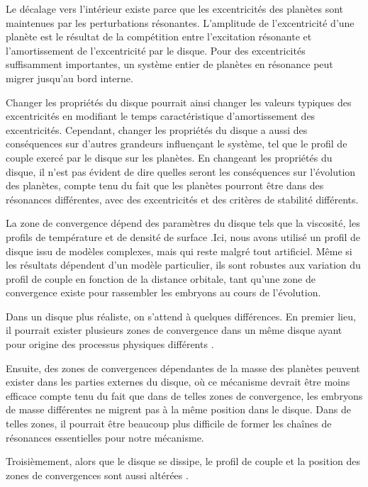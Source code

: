 \bigskip

Le décalage vers l'intérieur existe parce que les excentricités des planètes sont maintenues par les perturbations résonantes. L'amplitude de l'excentricité d'une planète est le résultat de la compétition entre l'excitation résonante et l'amortissement de l'excentricité par le disque. Pour des excentricités suffisamment importantes, un système entier de planètes en résonance peut migrer jusqu'au bord interne.

Changer les propriétés du disque pourrait ainsi changer les valeurs typiques des excentricités en modifiant le temps caractéristique d'amortissement des excentricités. Cependant, changer les propriétés du disque a aussi des conséquences sur d'autres grandeurs influençant le système, tel que le profil de couple exercé par le disque sur les planètes. En changeant les propriétés du disque, il n'est pas évident de dire quelles seront les conséquences sur l'évolution des planètes, compte tenu du fait que les planètes pourront être dans des résonances différentes, avec des excentricités et des critères de stabilité différents. 

La zone de convergence dépend des paramètres du disque tels que la viscosité, les profils de température et de densité de surface \citep[voir par exemple][]{paardekooper2011torque}.Ici, nous avons utilisé un profil de disque issu de modèles complexes, mais qui reste malgré tout artificiel. Même si les résultats dépendent d'un modèle particulier, ils sont robustes aux variation du profil de couple en fonction de la distance orbitale, tant qu'une zone de convergence existe pour rassembler les embryons au cours de l'évolution. 

\bigskip

Dans un disque plus réaliste, on s'attend à quelques différences. En premier lieu, il pourrait exister plusieurs zones de convergence dans un même disque ayant pour origine des processus physiques différents \citep{lyra2010orbital, hasegawa2011origin}. 

Ensuite, des zones de convergences dépendantes de la masse des planètes peuvent exister dans les parties externes du disque, où ce mécanisme devrait être moins efficace compte tenu du fait que dans de telles zones de convergence, les embryons de masse différentes ne migrent pas à la même position dans le disque. Dans de telles zones, il pourrait être beaucoup plus difficile de former les chaînes de résonances essentielles pour notre mécanisme.

Troisièmement, alors que le disque se dissipe, le profil de couple et la position des zones de convergences sont aussi altérées \citep{lyra2010orbital, horn2012orbital}. 

